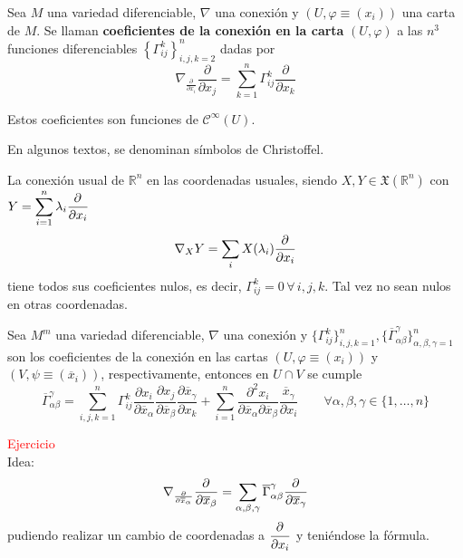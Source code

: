 \begin{defi}
    Sea $M$ una variedad diferenciable, $\nabla$ una conexión y $(U,\varphi\equiv (x_i))$ una carta de $M$. Se llaman \textbf{coeficientes de la conexión en la carta} $(U,\varphi)$ a las $n^3$ funciones diferenciables $\left\{\Gamma_{ij}^k\right\}_{i,j,k=2}^n$ dadas por $$\nabla_{\frac{\partial}{\partial x_i}} \dfrac{\partial}{\partial x_j} = \sum_{k =1}^n \Gamma_{ij}^k \dfrac{\partial}{\partial x_k}$$
\end{defi}
\begin{obs}
    Estos coeficientes son funciones de $\mathcal{C}^{\infty}(U)$.
\end{obs}
\begin{obs}
    En algunos textos, se denominan símbolos de Christoffel.
\end{obs}
\begin{ejem}
    La conexión usual de $\mathbb R^n$ en las coordenadas usuales, siendo $X, Y \in \mathfrak X(\mathbb R^n)$ con $\displaystyle Y=\sum_{i=1}^n \lambda_i \dfrac{\partial^{} }{\partial x_i}$
    $$\nabla_X Y = \sum_i X(\lambda_i) \dfrac{\partial^{} }{\partial x_i}$$
    tiene todos sus coeficientes nulos, es decir, $\Gamma_{ij}^k = 0 \, \forall \, i,j,k$. Tal vez no sean nulos en otras coordenadas.
\end{ejem}

\begin{prop}
    Sea $M^m$ una variedad diferenciable, $\nabla$ una conexión y $\{\Gamma_{ij}^k\}_{i,j,k=1}^n, \{\overline{\Gamma}_{\alpha \beta}^{\gamma}\}_{\alpha,\beta,\gamma = 1}^n$ son los coeficientes de la conexión en las cartas $(U,\varphi\equiv (x_i))$ y $(V,\psi\equiv (\overline{x}_i))$, respectivamente, entonces en $U \cap V$ se cumple
    $$\overline{\Gamma}_{\alpha \beta}^{\gamma} = \sum_{i,j,k=1}^n \Gamma_{ij}^k \dfrac{\partial x_i}{\partial \overline{x}_{\alpha}} \dfrac{\partial x_j}{\partial \overline{x}_{\beta}} \dfrac{\partial \overline x_{\gamma}}{\partial x_k} + \sum_{i=1}^n \dfrac{\partial^2 x_i}{\partial \overline x_{\alpha} \partial \overline x_{\beta}} \dfrac{\overline x_{\gamma}}{\partial x_i} \qquad \forall \alpha,\beta,\gamma \in  \{1,\dots,n\}$$
\end{prop}
\begin{dem} \textcolor{red}{Ejercicio} \\ Idea:
$$\nabla_{\frac{\partial}{\partial \overline{x}_{\alpha}}} \dfrac{\partial^{} }{\partial \overline{x}_{\beta}} = \sum_{\alpha,\beta,\gamma} \overline{\Gamma}_{\alpha\beta}^{\gamma} \dfrac{\partial^{} }{\partial \overline{x}_{\gamma}}$$
pudiendo realizar un cambio de coordenadas a $\dfrac{\partial^{} }{\partial x_i}$ y teni\'endose la f\'ormula.
\end{dem}


